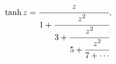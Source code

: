 \[\mathop{\tanh\/}\nolimits z=\cfrac{z}{1+\cfrac{z^{2}}{3+\cfrac{z^{2}}{5+\cfrac%
{z^{2}}{7+\cdots}}}},\]
